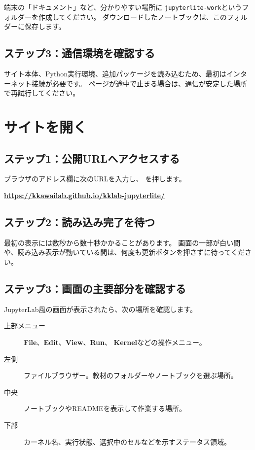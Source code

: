 \documentclass[a4paper,11pt]{ltjsarticle}
\newcommand{\menu}[1]{\textsf{\bfseries #1}}
\newcommand{\keycap}[1]{%
  \tcbox[
    on line,
    colback=GuideLightGray,
    colframe=GuideGray!50,
    boxrule=0.4pt,
    arc=1.5pt,
    left=3pt,right=3pt,top=1pt,bottom=1pt
  ]{\sffamily\small #1}%
}
\newcommand{\filepath}[1]{\nolinkurl{#1}}
\newcommand{\siteurl}{\url{https://kkawailab.github.io/kklab-jupyterlite/}}
\begin{document}
端末の「ドキュメント」など、分かりやすい場所に
\filepath{jupyterlite-work}というフォルダーを作成してください。
ダウンロードしたノートブックは、このフォルダーに保存します。

\subsection{ステップ3：通信環境を確認する}

サイト本体、Python実行環境、追加パッケージを読み込むため、最初はインターネット接続が必要です。
ページが途中で止まる場合は、通信が安定した場所で再試行してください。

\section{サイトを開く}

\subsection{ステップ1：公開URLへアクセスする}

ブラウザのアドレス欄に次のURLを入力し、\keycap{Enter}を押します。

\begin{center}
  \Large\bfseries\siteurl
\end{center}

\subsection{ステップ2：読み込み完了を待つ}

最初の表示には数秒から数十秒かかることがあります。
画面の一部が白い間や、読み込み表示が動いている間は、何度も更新ボタンを押さずに待ってください。

\subsection{ステップ3：画面の主要部分を確認する}

JupyterLab風の画面が表示されたら、次の場所を確認します。

\begin{description}
  \item[上部メニュー] \menu{File}、\menu{Edit}、\menu{View}、\menu{Run}、
    \menu{Kernel}などの操作メニュー。
  \item[左側] ファイルブラウザー。教材のフォルダーやノートブックを選ぶ場所。
  \item[中央] ノートブックやREADMEを表示して作業する場所。
  \item[下部] カーネル名、実行状態、選択中のセルなどを示すステータス領域。
\end{description}
\end{document}
